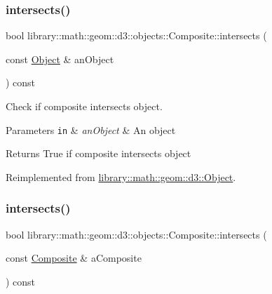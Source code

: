 \subsubsection{\texorpdfstring{intersects()}{intersects()}\hspace{0.1cm}{\footnotesize\ttfamily [1/2]}}
{\footnotesize\ttfamily bool library\+::math\+::geom\+::d3\+::objects\+::\+Composite\+::intersects (\begin{DoxyParamCaption}\item[{const \hyperlink{classlibrary_1_1math_1_1geom_1_1d3_1_1_object}{Object} \&}]{an\+Object }\end{DoxyParamCaption}) const\hspace{0.3cm}{\ttfamily [virtual]}}



Check if composite intersects object. 


\begin{DoxyParams}[1]{Parameters}
\mbox{\tt in}  & {\em an\+Object} & An object \\
\hline
\end{DoxyParams}
\begin{DoxyReturn}{Returns}
True if composite intersects object 
\end{DoxyReturn}


Reimplemented from \hyperlink{classlibrary_1_1math_1_1geom_1_1d3_1_1_object_a98c37b46f2fdc5f22bc123a757dcf73e}{library\+::math\+::geom\+::d3\+::\+Object}.

\mbox{\label{classlibrary_1_1math_1_1geom_1_1d3_1_1objects_1_1_composite_a38e1bd1a0bdc2623df25751307f2c834}} 
\subsubsection{\texorpdfstring{intersects()}{intersects()}\hspace{0.1cm}{\footnotesize\ttfamily [2/2]}}
{\footnotesize\ttfamily bool library\+::math\+::geom\+::d3\+::objects\+::\+Composite\+::intersects (\begin{DoxyParamCaption}\item[{const \hyperlink{classlibrary_1_1math_1_1geom_1_1d3_1_1objects_1_1_composite}{Composite} \&}]{a\+Composite }\end{DoxyParamCaption}) const}




